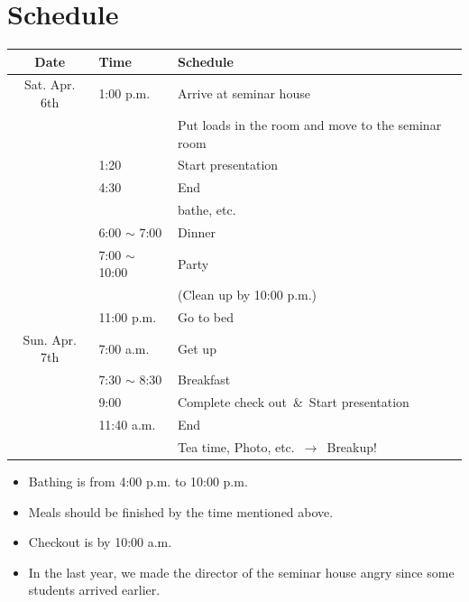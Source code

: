 \documentclass[unicode,a4paper,11pt]{ltjsarticle}
\begin{document}
\label{eng_page}

\section{Schedule}

\begin{center}
  \begin{tabular}{cll}\hline
    Date          & Time               & Schedule                                           \\ \hline
    Sat. Apr. 6th & 1:00 p.m.          & Arrive at seminar house                            \\
                  &                    & Put loads in the room and move to the seminar room \\
                  & 1:20               & Start presentation                                 \\
                  & 4:30               & End                                                \\
                  &                    & bathe, etc.                                        \\
                  & 6:00  $\sim$ 7:00  & Dinner                                             \\
                  & 7:00  $\sim$ 10:00 & Party                                              \\
                  &                    & (Clean up by 10:00 p.m.)                           \\
                  & 11:00 p.m.         & Go to bed                                          \\ \hline
    Sun. Apr. 7th & 7:00 a.m.          & Get up                                             \\
                  & 7:30 $\sim$  8:30  & Breakfast                                          \\
                  & 9:00               & Complete check out\ \&\ Start presentation         \\
                  & 11:40 a.m.         & End                                                \\
                  &                    & Tea time, Photo, etc.\ $\rightarrow$\ Breakup!     \\ \hline
  \end{tabular}
\end{center}

\begin{itemize}
  \item
        Bathing is from  4:00 p.m. to 10:00 p.m.
  \item
        Meals should be finished by the time mentioned above.
  \item
        Checkout is by 10:00 a.m.
  \item
        In the last year, we made the director of the seminar house angry since some students arrived earlier.
\end{itemize}
\end{document}
